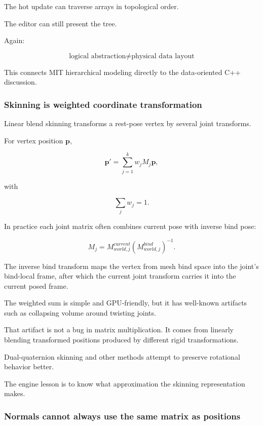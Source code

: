 The hot update can traverse arrays in topological order.

The editor can still present the tree.

Again:

\[
\boxed{
\text{logical abstraction}
\neq
\text{physical data layout}
}
\]

This connects MIT hierarchical modeling directly to the data-oriented C++ discussion.

\subsubsection{Skinning is weighted coordinate transformation}\label{03-visual-computing-i-ch001-skinning-is-weighted-coordinate-transformation}

Linear blend skinning transforms a rest-pose vertex by several joint transforms.

For vertex position \(\mathbf p\),

\[
\mathbf p'
=
\sum_{j=1}^{k}
w_j
M_j
\mathbf p,
\]

with

\[
\sum_j w_j=1.
\]

In practice each joint matrix often combines current pose with inverse bind pose:

\[
M_j
=
M_{world,j}^{current}
\left(M_{world,j}^{bind}\right)^{-1}.
\]

The inverse bind transform maps the vertex from mesh bind space into the joint's bind-local frame, after which the current joint transform carries it into the current posed frame.

The weighted sum is simple and GPU-friendly, but it has well-known artifacts such as collapsing volume around twisting joints.

That artifact is not a bug in matrix multiplication. It comes from linearly blending transformed positions produced by different rigid transformations.

Dual-quaternion skinning and other methods attempt to preserve rotational behavior better.

The engine lesson is to know what approximation the skinning representation makes.

\subsubsection{Normals cannot always use the same matrix as positions}\label{03-visual-computing-i-ch001-normals-cannot-always-use-the-same-matrix-as-positions}

